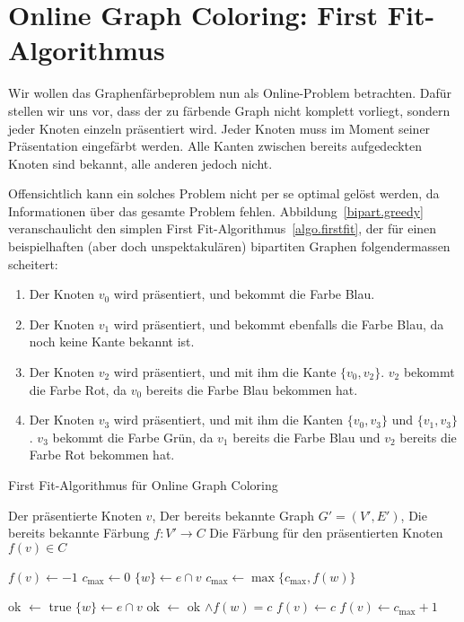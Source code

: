 \documentclass[11pt]{scrreprt} %
\theoremstyle{definition}
\begin{document}
\section{Online Graph Coloring: First Fit-Algorithmus}

Wir wollen das Graphenfärbeproblem nun als Online-Problem betrachten. Dafür stellen wir uns vor, dass der zu färbende Graph nicht komplett vorliegt, sondern jeder Knoten einzeln präsentiert wird. Jeder Knoten muss im Moment seiner Präsentation eingefärbt werden. Alle Kanten zwischen bereits aufgedeckten Knoten sind bekannt, alle anderen jedoch nicht. \cite{lovasz}

Offensichtlich kann ein solches Problem nicht per se optimal gelöst werden, da Informationen über das gesamte Problem fehlen. Abbildung~\ref{bipart.greedy} veranschaulicht den simplen First Fit-Algorithmus~\ref{algo.firstfit}, der für einen beispielhaften (aber doch unspektakulären) bipartiten Graphen folgendermassen scheitert:
\begin{enumerate}
\item Der Knoten $v_0$ wird präsentiert, und bekommt die Farbe Blau.
\item Der Knoten $v_1$ wird präsentiert, und bekommt ebenfalls die Farbe Blau, da noch keine Kante bekannt ist.
\item Der Knoten $v_2$ wird präsentiert, und mit ihm die Kante $\{v_0, v_2\}$. $v_2$ bekommt die Farbe Rot, da $v_0$ bereits die Farbe Blau bekommen hat.
\item Der Knoten $v_3$ wird präsentiert, und mit ihm die Kanten $\{v_0, v_3\}$ und $\{v_1, v_3\}$. $v_3$ bekommt die Farbe Grün, da $v_1$ bereits die Farbe Blau und $v_2$ bereits die Farbe Rot bekommen hat.
\end{enumerate}

\begin{algorithm}
\caption{First Fit-Algorithmus für Online Graph Coloring}
\label{algo.firstfit}
\begin{algorithmic}
\Require
	\State Der präsentierte Knoten $v$,
	\State Der bereits bekannte Graph $G' = (V', E')$,
	\State Die bereits bekannte Färbung $f : V' \rightarrow C$
\Ensure
	\State Die Färbung für den präsentierten Knoten $f(v) \in C$
\Statex

\State $f(v) \gets -1$
\State $c_\text{max} \gets 0 $
	\State $\{w\} \gets e \cap v$
	\State $c_\text{max} \gets \max \{c_\text{max}, f(w) \}$
\EndFor

\Statex

\State ok $\gets$ true
	\State $\{w\} \gets e \cap v$
	\State ok $\gets$ ok $\land f(w) = c$
\EndFor
{}
\State $f(v) \gets c$
\EndIf
\EndIf
\EndFor
\Statex
{}
\State $f(v) \gets c_\text{max} + 1$
\EndIf

\end{algorithmic}
\end{algorithm}
\end{document}
